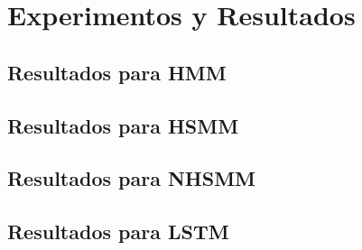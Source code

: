 
\chapter{Experimentos y Resultados}

\ifpdf
    \graphicspath{{Chapter5/Figs/Raster/}{Chapter5/Figs/PDF/}{Chapter5/Figs/}}
\else
    \graphicspath{{Chapter5/Figs/Vector/}{Chapter5/Figs/}}
\fi

\section{Resultados para HMM} %
\label{section5.1}

\section{Resultados para HSMM} %
\label{section5.2}

\section{Resultados para NHSMM} %
\label{section5.3}

\section{Resultados para LSTM} %
\label{section5.4}
